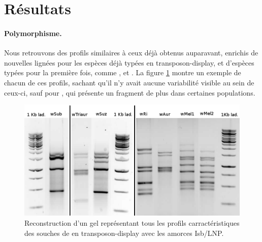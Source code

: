 \section{Résultats} %
\label{sec:résultats}

\paragraph{Polymorphisme.} %
\label{par:polymorphisme}
Nous retrouvons des profils similaires à ceux déjà obtenus auparavant\cite{memHH}, enrichis de nouvelles lignées pour les espèces déjà typées en transposon-display, et d’espèces typées pour la première fois, comme ,  et . %
La figure \ref{fig:profils} montre un exemple de chacun de ces profils, sachant qu’il n’y avait aucune variabilité visible au sein de ceux-ci, sauf pour , qui présente un fragment de plus %
dans certaines populations.

\begin{figure}[h]
	\begin{center}
		\includegraphics[width=150mm]{images/profils_crop.png}
	\end{center}
	\caption{Reconstruction d'un gel représentant tous les profils carractéristiques des souches de  en transposon-display avec les amorces Isb/LNP.}
	\label{fig:profils}
\end{figure}



